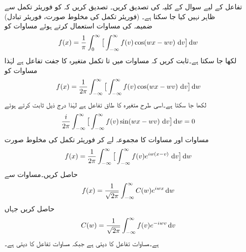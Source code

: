 \quad
تفاعل  کے لیے سوال  کے کلیہ کی تصدیق کریں۔ 
\quad
تصدیق کریں کہ  کو فوریئر تکمل سے ظاہر نہیں کیا جا سکتا ہے۔
\quad (فوریئر تکمل کی مخلوط صورت، فوریئر تبادل)\\
ضمیمہ  کی مساوات  استعمال کرتے ہوئے مساوات  کو
\begin{align}\label{مساوات_فوریئر_بدل_الف}
f(x)=\frac{1}{\pi}\int_{0}^{\infty} \big[\int_{-\infty}^{\infty} f(v)\cos(wx-wv)\,\dif v\big]\dif w
\end{align}
لکھا جا سکتا ہے۔ثابت کریں کہ مساوات  میں  تا  تکمل متغیرہ  کا جفت تفاعل ہے لہٰذا مساوات  کو
\begin{align}\label{مساوات_فوریئر_بدل_ب}
f(x)=\frac{1}{2\pi}\int_{-\infty}^{\infty} \big[\int_{-\infty}^{\infty} f(v)\cos(wx-wv)\,\dif v\big]\dif w
\end{align}
لکھا جا سکتا ہے۔اسی طرح  متغیرہ  کا طاق تفاعل ہے لہٰذا درج ذیل ثابت کرتے ہوئے
\begin{align}\label{مساوات_فوریئر_بدل_پ}
\frac{i}{2\pi}\int_{-\infty}^{\infty} \big[\int_{-\infty}^{\infty} f(v)\sin(wx-wv)\,\dif v\big]\dif w=0
\end{align}
مساوات  اور مساوات  کا مجموعہ لے کر فوریئر تکمل کی مخلوط صورت
\begin{align}\label{مساوات_فوریئر_بدل_ت}
f(x)=\frac{1}{2\pi}\int_{-\infty}^{\infty} \big[\int_{-\infty}^{\infty} f(v)e^{iw(x-v)}\,\dif v\big]\dif w
\end{align}
حاصل کریں۔مساوات  سے 
\begin{align}\label{مساوات_فوریئر_بدل_ٹ}
f(x)=\frac{1}{\sqrt{2\pi}}\int_{-\infty}^{\infty} C(w)e^{iwx}\dif w
\end{align}
حاصل کریں جہاں
\begin{align}\label{مساوات_فوریئر_بدل_ث}
C(w)=\frac{1}{\sqrt{2\pi}}\int_{-\infty}^{\infty} f(v)e^{-iwv}\dif v
\end{align}
ہے۔مساوات  تفاعل  کا  دیتی ہے جبکہ مساوات  تفاعل  کا  دیتی ہے۔
